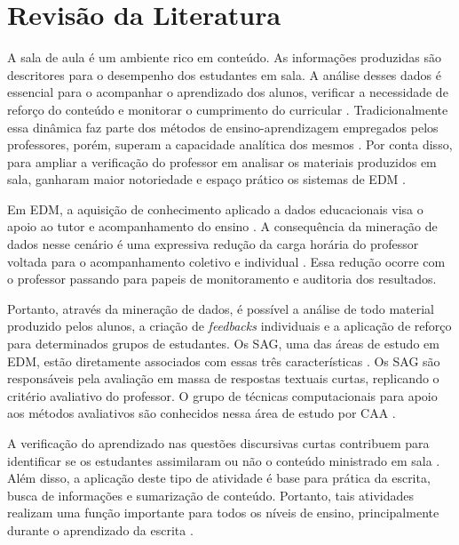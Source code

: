 \chapter{Revisão da Literatura}
\label{cap-literatura}



A sala de aula é um ambiente rico em conteúdo. As informações produzidas são descritores para o desempenho dos estudantes em sala. A análise desses dados é essencial para o acompanhar o aprendizado dos alunos, verificar a necessidade de reforço do conteúdo e monitorar o cumprimento do curricular \cite{sweeta2021}. Tradicionalmente essa dinâmica faz parte dos métodos de ensino-aprendizagem empregados pelos professores, porém, superam a capacidade analítica dos mesmos \cite{madero2019}. Por conta disso, para ampliar a verificação do professor em analisar os materiais produzidos em sala, ganharam maior notoriedade e espaço prático os sistemas de EDM \cite{siemens2012, romero2010}.

Em EDM, a aquisição de conhecimento aplicado a dados educacionais visa o apoio ao tutor e acompanhamento do ensino \cite{ferreira-mello2019}. A consequência da mineração de dados nesse cenário é uma expressiva redução da carga horária do professor voltada para o acompanhamento coletivo e individual \cite{sweeta2021}. Essa redução ocorre com o professor passando para papeis de monitoramento e auditoria dos resultados.

Portanto, através da mineração de dados, é possível a análise de todo material produzido pelos alunos, a criação de \textit{feedbacks} individuais e a aplicação de reforço para determinados grupos de estudantes. Os SAG, uma das áreas de estudo em EDM, estão diretamente associados com essas três características \cite{burrows2015}. Os SAG são responsáveis pela avaliação em massa de respostas textuais curtas, replicando o critério avaliativo do professor. O grupo de técnicas computacionais para apoio aos métodos avaliativos são conhecidos nessa área de estudo por CAA \cite{perez-marin2009}.

A verificação do aprendizado nas questões discursivas curtas contribuem para identificar se os estudantes assimilaram ou não o conteúdo ministrado em sala \cite{oliveira2013}. Além disso, a aplicação deste tipo de atividade é base para prática da escrita, busca de informações e sumarização de conteúdo. Portanto, tais atividades realizam uma função importante para todos os níveis de ensino, principalmente durante o aprendizado da escrita \cite{johnstone2002}. 

